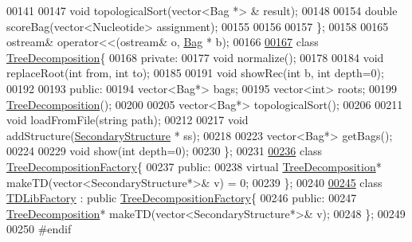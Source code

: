 \begin{DoxyCode}
00141 
00147     \textcolor{keywordtype}{void} topologicalSort(vector<Bag *> & result);
00148 
00154     \textcolor{keywordtype}{double} scoreBag(vector<Nucleotide> assignment);
00155 
00156 
00157 \};  
00158 
00165 ostream& operator<<(ostream& o, \hyperlink{class_bag}{Bag} * b);
00166 
\hyperlink{class_tree_decomposition}{00167} \textcolor{keyword}{class }\hyperlink{class_tree_decomposition}{TreeDecomposition}\{
00168   \textcolor{keyword}{private}:
00177     \textcolor{keywordtype}{void} normalize();
00178     
00184     \textcolor{keywordtype}{void} replaceRoot(\textcolor{keywordtype}{int} from, \textcolor{keywordtype}{int} to);
00185 
00191     \textcolor{keywordtype}{void} showRec(\textcolor{keywordtype}{int} b, \textcolor{keywordtype}{int} depth=0);
00192 
00193   \textcolor{keyword}{public}:
00194     vector<Bag*> bags;  
00195     vector<int> roots;
00199     \hyperlink{class_tree_decomposition}{TreeDecomposition}();
00200     
00205     vector<Bag*> topologicalSort();
00206     
00211     \textcolor{keywordtype}{void} loadFromFile(\textcolor{keywordtype}{string} path);
00212     
00217     \textcolor{keywordtype}{void} addStructure(\hyperlink{class_secondary_structure}{SecondaryStructure} * ss);
00218 
00223     vector<Bag*> getBags();
00224 
00229     \textcolor{keywordtype}{void} show(\textcolor{keywordtype}{int} depth=0);
00230 \};
00231 
\hyperlink{class_tree_decomposition_factory}{00236} \textcolor{keyword}{class }\hyperlink{class_tree_decomposition_factory}{TreeDecompositionFactory}\{
00237   \textcolor{keyword}{public}:
00238     \textcolor{keyword}{virtual} \hyperlink{class_tree_decomposition}{TreeDecomposition}* makeTD(vector<SecondaryStructure*>& v) = 0;
00239 \};
00240 
\hyperlink{class_t_d_lib_factory}{00245} \textcolor{keyword}{class }\hyperlink{class_t_d_lib_factory}{TDLibFactory} : \textcolor{keyword}{public} \hyperlink{class_tree_decomposition_factory}{TreeDecompositionFactory}\{
00246   \textcolor{keyword}{public}:
00247     \hyperlink{class_tree_decomposition}{TreeDecomposition}* makeTD(vector<SecondaryStructure*>& v);
00248 \};
00249 
00250 \textcolor{preprocessor}{#endif}
\end{DoxyCode}
